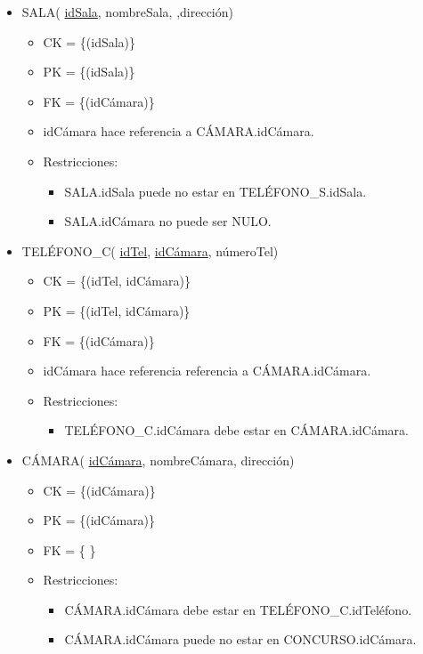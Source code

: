\begin{itemize}
\item SALA( \underline{idSala}, nombreSala, ,dirección)
	\begin{itemize}
		\item CK = \{(idSala)\}
		\item PK = \{(idSala)\}
		\item FK = \{(idCámara)\}
		\item idCámara hace referencia a CÁMARA.idCámara.
		\item Restricciones:
			\begin{itemize}
			\item SALA.idSala puede no estar en TELÉFONO\_S.idSala.
			\item SALA.idCámara no puede ser NULO.
			\\
			\end{itemize}
	\end{itemize}
	
	
\item TELÉFONO\_C( \underline{idTel}, \underline{idCámara}, númeroTel) 
	\begin{itemize}
		\item CK = \{(idTel, idCámara)\}
		\item PK = \{(idTel, idCámara)\}
		\item FK = \{(idCámara)\}
		\item idCámara hace referencia referencia a CÁMARA.idCámara.
		\item Restricciones:
			\begin{itemize}
			\item TELÉFONO\_C.idCámara debe estar en CÁMARA.idCámara.
			\\
			\end{itemize}
	\end{itemize}


\item CÁMARA( \underline{idCámara}, nombreCámara, dirección)
	\begin{itemize}
		\item CK = \{(idCámara)\}
		\item PK = \{(idCámara)\}
		\item FK = \{ \}
		\item Restricciones:
			\begin{itemize}
			\item CÁMARA.idCámara debe estar en TELÉFONO\_C.idTeléfono.
			\item CÁMARA.idCámara puede no estar en CONCURSO.idCámara.
			\\			
			\end{itemize}
	\end{itemize}
		

\end{itemize}
